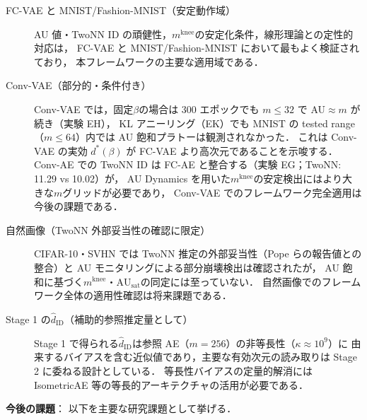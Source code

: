 \documentclass[11pt,a4paper]{jsarticle}
\newcommand{\kap}{\kappa}
\newcommand{\AUsat}{\mathrm{AU}_{\mathrm{sat}}}
\newcommand{\mknee}{m^{\mathrm{knee}}}
\begin{document}
\begin{description}
  \item[FC-VAE と MNIST/Fashion-MNIST（安定動作域）]
        AU 値・TwoNN ID の頑健性，$\mknee$の安定化条件，線形理論との定性的対応は，
        FC-VAE と MNIST/Fashion-MNIST において最もよく検証されており，
        本フレームワークの主要な適用域である．
  \item[Conv-VAE（部分的・条件付き）]
        Conv-VAE では，固定$\beta$の場合は 300 エポックでも $m \leq 32$ で AU$\approx m$ が続き（実験 EH），
        KL アニーリング（EK）でも MNIST の tested range（$m \leq 64$）内では AU 飽和プラトーは観測されなかった．
        これは Conv-VAE の実効 $d^*(\beta)$ が FC-VAE より高次元であることを示唆する．
        Conv-AE での TwoNN ID は FC-AE と整合する（実験 EG；TwoNN: 11.29 vs 10.02）が，
        AU Dynamics を用いた$\mknee$の安定検出にはより大きな$m$グリッドが必要であり，
        Conv-VAE でのフレームワーク完全適用は今後の課題である．
  \item[自然画像（TwoNN 外部妥当性の確認に限定）]
        CIFAR-10・SVHN では TwoNN 推定の外部妥当性（Pope らの報告値との整合）と
        AU モニタリングによる部分崩壊検出は確認されたが，
        AU 飽和に基づく$\mknee$・$\AUsat$の同定には至っていない．
        自然画像でのフレームワーク全体の適用性確認は将来課題である．
  \item[Stage 1 の$\hat{d}_\mathrm{ID}$（補助的参照推定量として）]
        Stage 1 で得られる$\hat{d}_\mathrm{ID}$は参照 AE（$m=256$）の非等長性（$\kap \approx 10^9$）に
        由来するバイアスを含む近似値であり，主要な有効次元の読み取りは Stage 2 に委ねる設計としている．
        等長性バイアスの定量的解消には IsometricAE 等の等長的アーキテクチャの活用が必要である．
\end{description}

\textbf{今後の課題}：
以下を主要な研究課題として挙げる．
\end{document}
